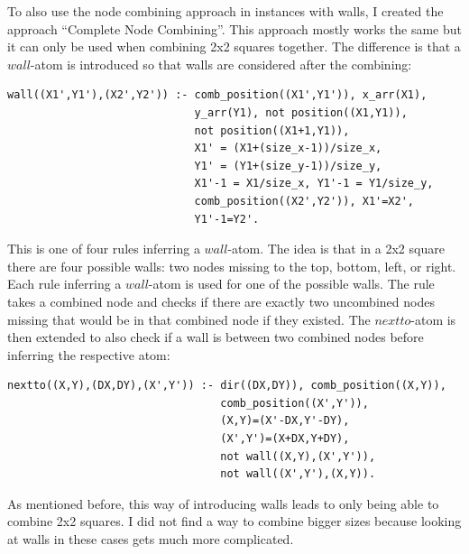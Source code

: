 \documentclass[runningheads]{llncs}
\begin{document}
To also use the node combining approach in instances with walls, I created the approach ``Complete Node Combining''. This approach mostly works the same but it can only be used when combining 2x2 squares together. The difference is that a $wall$-atom is introduced so that walls are considered after the combining:
\begin{verbatim}
wall((X1',Y1'),(X2',Y2')) :- comb_position((X1',Y1')), x_arr(X1), 
                             y_arr(Y1), not position((X1,Y1)), 
                             not position((X1+1,Y1)),
                             X1' = (X1+(size_x-1))/size_x, 
                             Y1' = (Y1+(size_y-1))/size_y,
                             X1'-1 = X1/size_x, Y1'-1 = Y1/size_y,
                             comb_position((X2',Y2')), X1'=X2', 
                             Y1'-1=Y2'.
\end{verbatim}
This is one of four rules inferring a $wall$-atom. The idea is that in a 2x2 square there are four possible walls: two nodes missing to the top, bottom, left, or right. Each rule inferring a $wall$-atom is used for one of the possible walls. The rule takes a combined node and checks if there are exactly two uncombined nodes missing that would be in that combined node if they existed. The $nextto$-atom is then extended to also check if a wall is between two combined nodes before inferring the respective atom:
\begin{verbatim}
nextto((X,Y),(DX,DY),(X',Y')) :- dir((DX,DY)), comb_position((X,Y)), 
                                 comb_position((X',Y')),
                                 (X,Y)=(X'-DX,Y'-DY), 
                                 (X',Y')=(X+DX,Y+DY), 
                                 not wall((X,Y),(X',Y')), 
                                 not wall((X',Y'),(X,Y)).
\end{verbatim}
As mentioned before, this way of introducing walls leads to only being able to combine 2x2 squares. I did not find a way to combine bigger sizes because looking at walls in these cases gets much more complicated. \\
\end{document}
